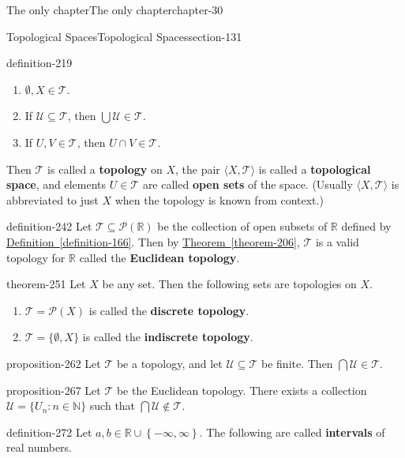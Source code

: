 \documentclass[oneside,10pt,]{book}
\newcommand{\terminology}[1]{\textbf{#1}}
\newcommand{\tuple}[1]{\langle #1 \rangle}
\newcommand{\mb}{\mathbb}
\newcommand{\mc}{\mathcal}
\newcommand{\setList}[1]{\left\{#1\right\}}
\begin{document}
\begin{chapterptx}{The only chapter}{}{The only chapter}{}{}{chapter-30}
\begin{sectionptx}{Topological Spaces}{}{Topological Spaces}{}{}{section-131}
\begin{definition}{}{definition-219}
\begin{enumerate}
\item\hypertarget{li-224}{}\(\emptyset,X\in\mc T\).%
\item\hypertarget{li-226}{}If \(\mc U\subseteq\mc T\), then \(\bigcup\mc U\in\mc T\).%
\item\hypertarget{li-229}{}If \(U,V\in\mc T\), then \(U\cap V\in\mc T\).%
\end{enumerate}
\hypertarget{p-232}{}%
Then \(\mc T\) is called a \terminology{topology} on \(X\), the pair \(\tuple{X,\mc T}\) is called a \terminology{topological space}, and elements \(U\in\mc T\) are called \terminology{open sets} of the space. (Usually \(\tuple{X,\mc T}\) is abbreviated to just \(X\) when the topology is known from context.)%
\end{definition}
\begin{definition}{}{definition-242}%
\hypertarget{p-243}{}%
Let \(\mc T\subseteq\mc P(\mb R)\) be the collection of open subsets of \(\mb R\) defined by \hyperref[definition-166]{Definition~\ref{definition-166}}. Then by \hyperref[theorem-206]{Theorem~\ref{theorem-206}}, \(\mc T\) is a valid topology for \(\mb R\) called the \terminology{Euclidean topology}.%
\end{definition}
\begin{theorem}{}{}{theorem-251}%
\hypertarget{p-252}{}%
Let \(X\) be any set. Then the following sets are topologies on \(X\).%
\leavevmode%
\begin{enumerate}
\item\hypertarget{li-256}{}\(\mc T=\mc P(X)\) is called the \terminology{discrete topology}.%
\item\hypertarget{li-259}{}\(\mc T=\{\emptyset,X\}\) is called the \terminology{indiscrete topology}.%
\end{enumerate}
\end{theorem}
\begin{proposition}{}{}{proposition-262}%
\hypertarget{p-263}{}%
Let \(\mc T\) be a topology, and let \(\mc U\subseteq\mc T\) be finite. Then \(\bigcap\mc U\in\mc T\).%
\end{proposition}
\begin{proposition}{}{}{proposition-267}%
\hypertarget{p-268}{}%
Let \(\mc T\) be the Euclidean topology. There exists a collection \(\mc U=\{U_n:n\in\mb N\}\) such that \(\bigcap\mc U\not\in\mc T\).%
\end{proposition}
\begin{definition}{}{definition-272}%
\hypertarget{p-273}{}%
Let \(a,b\in\mb R\cup\setList{-\infty,\infty}\). The following are called \terminology{intervals} of real numbers.%

\end{definition}
\end{sectionptx}
\end{chapterptx}
\end{document}
